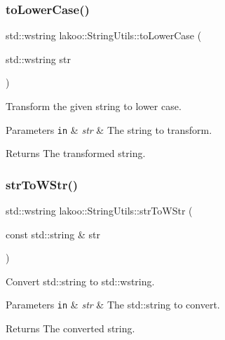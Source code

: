 \subsubsection{\texorpdfstring{to\+Lower\+Case()}{toLowerCase()}}
{\footnotesize\ttfamily std\+::wstring lakoo\+::\+String\+Utils\+::to\+Lower\+Case (\begin{DoxyParamCaption}\item[{std\+::wstring}]{str }\end{DoxyParamCaption})}



Transform the given string to lower case. 


\begin{DoxyParams}[1]{Parameters}
\mbox{\tt in}  & {\em str} & The string to transform. \\
\hline
\end{DoxyParams}
\begin{DoxyReturn}{Returns}
The transformed string. 
\end{DoxyReturn}
\mbox{\label{namespacelakoo_1_1_string_utils_a24ac7b7c2b78ae88065b47ca076a05bc}} 
\subsubsection{\texorpdfstring{str\+To\+W\+Str()}{strToWStr()}}
{\footnotesize\ttfamily std\+::wstring lakoo\+::\+String\+Utils\+::str\+To\+W\+Str (\begin{DoxyParamCaption}\item[{const std\+::string \&}]{str }\end{DoxyParamCaption})}



Convert std\+::string to std\+::wstring. 


\begin{DoxyParams}[1]{Parameters}
\mbox{\tt in}  & {\em str} & The std\+::string to convert. \\
\hline
\end{DoxyParams}
\begin{DoxyReturn}{Returns}
The converted string. 
\end{DoxyReturn}
\mbox{\label{namespacelakoo_1_1_string_utils_abdaf50b4fed2e6f736df9aa735a4ac09}} 

